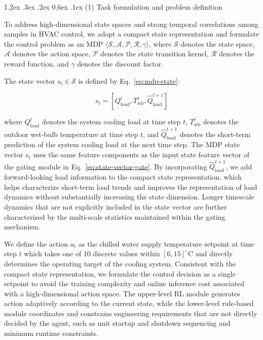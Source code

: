 \documentclass[preprint,12pt,number]{elsarticle}
\makeatletter
\renewcommand\paragraph{\@startsection{paragraph}{4}{\z@}%
  {1.2ex \@plus .3ex \@minus .2ex}%
  {0.6ex \@plus .1ex}%
  {\normalfont\normalsize}}
\makeatother
\begin{document}
\paragraph{(1) Task formulation and problem definition}\label{task-formulation-and-problem-definition}

To address high-dimensional state spaces and strong temporal correlations among samples in HVAC control, we adopt a compact state representation and formulate the control problem as an MDP \(\langle \mathcal{S}, \mathcal{A}, \mathcal{P}, \mathcal{R}, \gamma \rangle\), where \(\mathcal{S}\) denotes the state space, \(\mathcal{A}\) denotes the action space, \(\mathcal{P}\) denotes the state transition kernel, \(\mathcal{R}\) denotes the reward function, and \(\gamma\) denotes the discount factor.

The state vector \(s_t \in \mathcal{S}\) is defined by Eq.~\eqref{eq:mdp-state}:

\[s_t = [Q_{\mathrm{load}}^t, T_{\mathrm{wb}}^t, \hat{Q}_{\mathrm{load}}^{t+1}] \tag{17}\label{eq:mdp-state}\]

\noindent where \(Q_{\mathrm{load}}^t\) denotes the system cooling load at time step \(t\), \(T_{\mathrm{wb}}^t\) denotes the outdoor wet-bulb temperature at time step \(t\), and \(\hat{Q}_{\mathrm{load}}^{t+1}\) denotes the short-term prediction of the system cooling load at the next time step. The MDP state vector \(s_t\) uses the same feature components as the input state feature vector of the gating module in Eq.~\eqref{eq:state-vector-gate}. By incorporating \(\hat{Q}_{\mathrm{load}}^{t+1}\), we add forward-looking load information to the compact state representation, which helps characterize short-term load trends and improves the representation of load dynamics without substantially increasing the state dimension. Longer timescale dynamics that are not explicitly included in the state vector are further characterized by the multi-scale statistics maintained within the gating mechanism.

We define the action \(a_t\) as the chilled water supply temperature setpoint at time step \(t\) which takes one of 10 discrete values within \([6,15]^{\circ}\mathrm{C}\) and directly determines the operating target of the cooling system. Consistent with the compact state representation, we formulate the control decision as a single setpoint to avoid the training complexity and online inference cost associated with a high-dimensional action space. The upper-level RL module generates action adaptively according to the current state, while the lower-level rule-based module coordinates and constrains engineering requirements that are not directly decided by the agent, such as unit startup and shutdown sequencing and minimum runtime constraints.
\end{document}
